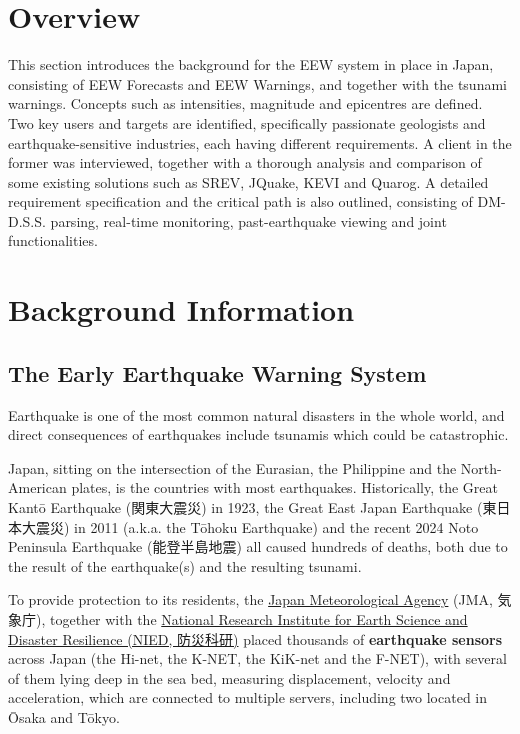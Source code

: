 \section*{Overview}

This section introduces the background for the EEW system in place in Japan, consisting of EEW Forecasts and EEW Warnings, and together with the tsunami warnings. Concepts such as intensities, magnitude and epicentres are defined. Two key users and targets are identified, specifically passionate geologists and earthquake-sensitive industries, each having different requirements. A client in the former was interviewed, together with a thorough analysis and comparison of some existing solutions such as SREV, JQuake, KEVI and Quarog. A detailed requirement specification and the critical path is also outlined, consisting of DM-D.S.S. parsing, real-time monitoring, past-earthquake viewing and joint functionalities.

\section{Background Information}

\subsection{The Early Earthquake Warning System}

Earthquake is one of the most common natural disasters in the whole world, and direct consequences of earthquakes include tsunamis which could be catastrophic.

Japan, sitting on the intersection of the Eurasian, the Philippine and the North-American plates, is the countries with most earthquakes. Historically, the Great Kant\=o Earthquake (関東大震災) in 1923, the Great East Japan Earthquake (東日本大震災) in 2011 (a.k.a. the T\=ohoku Earthquake) and the recent 2024 Noto Peninsula Earthquake (能登半島地震) all caused hundreds of deaths, both due to the result of the earthquake(s) and the resulting tsunami.

To provide protection to its residents, the \href{https://www.jma.go.jp/jma/index.html}{Japan Meteorological Agency} (JMA, 気象庁), together with the \href{https://www.bosai.go.jp}{National Research Institute for Earth Science and Disaster Resilience (NIED, 防災科研)} placed thousands of \textbf{earthquake sensors} across Japan (the Hi-net, the K-NET, the KiK-net and the F-NET), with several of them lying deep in the sea bed, measuring displacement, velocity and acceleration, which are connected to multiple servers, including two located in \=Osaka and T\=okyo.

